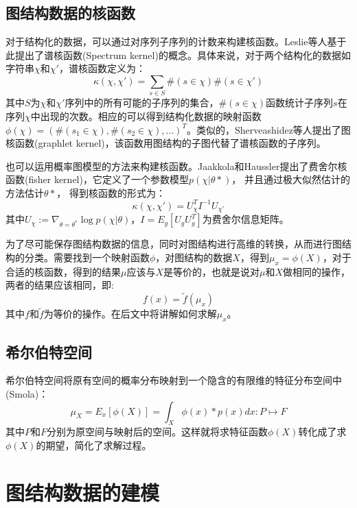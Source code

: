 \subsection{图结构数据的核函数}
对于结构化的数据，可以通过对序列子序列的计数来构建核函数。Leslie\cite{leslie2001spectrum}等人基于此提出了谱核函数(Spectrum kernel)的概念。具体来说，对于两个结构化的数据如字符串$\chi$和$\chi'$，谱核函数定义为：
\begin{equation}
\kappa(\chi, \chi') = \sum_{s\in S}\#(s\in \chi)\#(s \in \chi')
\end{equation}
其中$S$为$\chi$和$\chi'$序列中的所有可能的子序列的集合，$\#(s\in \chi)$函数统计子序列$s$在序列$\chi$中出现的次数。相应的可以得到结构化数据的映射函数$\phi(\chi)=(\#(s_1\in \chi), \#(s_2\in \chi), ...)^T$。类似的，Sherveashidez\cite{shervashidze2009efficient}等人提出了图核函数(graphlet kernel)，该函数用图结构的子图代替了谱核函数的子序列。
\par 也可以运用概率图模型的方法来构建核函数。Jaakkola和Haussler\cite{jaakkola1999using}提出了费舍尔核函数(fisher kernel)，它定义了一个参数模型$p(\chi|\theta*)$， 并且通过极大似然估计的方法估计$\theta*$， 得到核函数的形式为：
\begin{equation}
\kappa(\chi, \chi') = U_\chi^TI^{-1}U_{\chi'}
\end{equation}
其中$U_\chi := \nabla_{\theta=\theta^*}\log p(\chi|\theta)$，$I=E_g[U_gU_g^T]$为费舍尔信息矩阵。
\par 为了尽可能保存图结构数据的信息，同时对图结构进行高维的转换，从而进行图结构的分类。需要找到一个映射函数$\phi$，对图结构的数据$X$，得到$\mu_x = \phi(X)$，对于合适的核函数，得到的结果$\mu$应该与$X$是等价的，也就是说对$\mu$和$X$做相同的操作，两者的结果应该相同，即:
$$f(x)=\tilde{f}(\mu_x)$$
其中$f$和$\tilde{f}$为等价的操作。在后文中将讲解如何求解$\mu_x$。
\subsection{希尔伯特空间}
希尔伯特空间将原有空间的概率分布映射到一个隐含的有限维的特征分布空间中(Smola\cite{smola2007hilbert})：
$$\mu_X = E_x [\phi(X)] = \int_X \phi(x)*p(x)dx : P\mapsto F$$
其中$P$和$F$分别为原空间与映射后的空间。这样就将求特征函数$\phi(X)$转化成了求$\phi(X)$的期望，简化了求解过程。
\section{图结构数据的建模}
